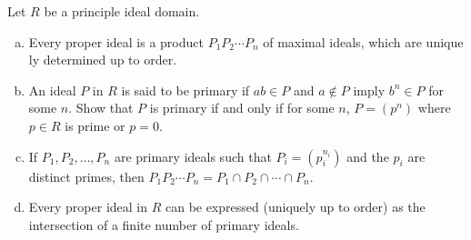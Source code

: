 $$ $$

\begin{ex}
    Let $R$ be a principle ideal domain.
    \begin{enumerate}[(a)]
        \item Every proper ideal is a product $P_{1}P_{2}\cdots P_{n}$ of maximal ideals, which are unique ly determined up to order.
        \item An ideal $P$ in $R$ is said to be primary if $ab\in P$ and $a\notin P$ imply $b^{n}\in P$ for some $n$. Show that $P$ is primary if and only if for some $n$, $P=(p^{n})$ where $p\in R$ is prime or $p=0$.
        \item If $P_{1}, P_{2},\dots, P_{n}$ are primary ideals such that $P_{i}=(p_{i}^{n_{i}})$ and the $p_{i}$ are distinct primes, then $P_{1}P_{2}\cdots P_{n}=P_{1}\cap P_{2}\cap \cdots\cap P_{n}$.
        \item Every proper ideal in $R$ can be expressed (uniquely up to order) as the intersection of a finite number of primary ideals.
    \end{enumerate}
\end{ex}

